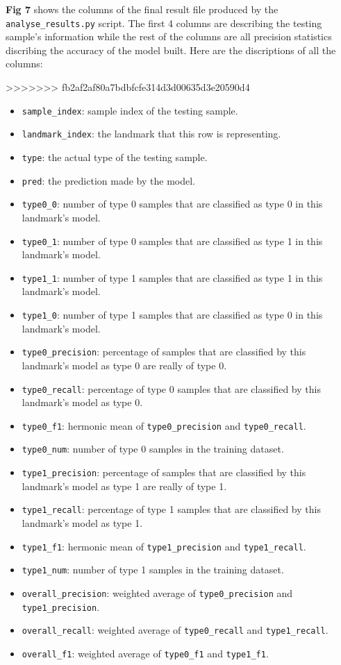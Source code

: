 \documentclass[10pt,letterpaper]{article}
\providecommand{\tightlist}{%
  \setlength{\itemsep}{0pt}\setlength{\parskip}{0pt}}
\begin{document}
\textbf{Fig 7} shows the columns of the final result file produced by
the \texttt{analyse\_results.py} script. The first 4 columns are
describing the testing sample's information while the rest of the
columns are all precision statistics discribing the accuracy of the
model built. Here are the discriptions of all the columns:

>>>>>>> fb2af2af80a7bdbfcfe314d3d00635d3e20590d4
\begin{itemize}
\tightlist
\item
  \texttt{sample\_index}: sample index of the testing sample.
\item
  \texttt{landmark\_index}: the landmark that this row is representing.
\item
  \texttt{type}: the actual type of the testing sample.
\item
  \texttt{pred}: the prediction made by the model.
\item
  \texttt{type0\_0}: number of type 0 samples that are classified as
  type 0 in this landmark's model.
\item
  \texttt{type0\_1}: number of type 0 samples that are classified as
  type 1 in this landmark's model.
\item
  \texttt{type1\_1}: number of type 1 samples that are classified as
  type 1 in this landmark's model.
\item
  \texttt{type1\_0}: number of type 1 samples that are classified as
  type 0 in this landmark's model.
\item
  \texttt{type0\_precision}: percentage of samples that are classified
  by this landmark's model as type 0 are really of type 0.
\item
  \texttt{type0\_recall}: percentage of type 0 samples that are
  classified by this landmark's model as type 0.
\item
  \texttt{type0\_f1}: hermonic mean of \texttt{type0\_precision} and
  \texttt{type0\_recall}.
\item
  \texttt{type0\_num}: number of type 0 samples in the training dataset.
\item
  \texttt{type1\_precision}: percentage of samples that are classified
  by this landmark's model as type 1 are really of type 1.
\item
  \texttt{type1\_recall}: percentage of type 1 samples that are
  classified by this landmark's model as type 1.
\item
  \texttt{type1\_f1}: hermonic mean of \texttt{type1\_precision} and
  \texttt{type1\_recall}.
\item
  \texttt{type1\_num}: number of type 1 samples in the training dataset.
\item
  \texttt{overall\_precision}: weighted average of
  \texttt{type0\_precision} and \texttt{type1\_precision}.
\item
  \texttt{overall\_recall}: weighted average of \texttt{type0\_recall}
  and \texttt{type1\_recall}.
\item
  \texttt{overall\_f1}: weighted average of \texttt{type0\_f1} and
  \texttt{type1\_f1}.
\end{itemize}
\end{document}
